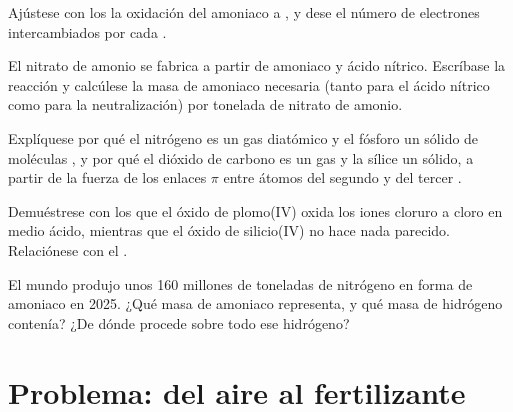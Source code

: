 \begin{exercise}[$\star\star$]\label{exo:b1:p-block-13-15:8}
Ajústese con los  la oxidación del amoniaco a
, y dese el número de electrones intercambiados por cada .
\end{exercise}

\begin{exercise}[$\star\star$]\label{exo:b1:p-block-13-15:9}
El nitrato de amonio se fabrica a partir de amoniaco y ácido nítrico.
Escríbase la reacción y calcúlese la masa de amoniaco necesaria (tanto
para el ácido nítrico como para la neutralización) por tonelada de
nitrato de amonio.
\end{exercise}

\begin{exercise}[$\star\star\star$]\label{exo:b1:p-block-13-15:10}
Explíquese por qué el nitrógeno es un gas diatómico y el fósforo un
sólido de moléculas , y por qué el dióxido de carbono es un gas y
la sílice un sólido, a partir de la fuerza de los enlaces $\pi$ entre
átomos del segundo y del tercer .
\end{exercise}

\begin{exercise}[$\star\star\star$]\label{exo:b1:p-block-13-15:11}
Demuéstrese con los  que el óxido de plomo(IV) oxida
los iones cloruro a cloro en medio ácido, mientras que el óxido de
silicio(IV) no hace nada parecido. Relaciónese con el .
\end{exercise}

\begin{exercise}[$\star\star\star$]\label{exo:b1:p-block-13-15:12}
El mundo produjo unos 160 millones de toneladas de nitrógeno en forma de
amoniaco en 2025. ¿Qué masa de amoniaco representa, y qué masa de
hidrógeno contenía? ¿De dónde procede sobre todo ese hidrógeno?
\end{exercise}

\section{Problema: del aire al fertilizante}

